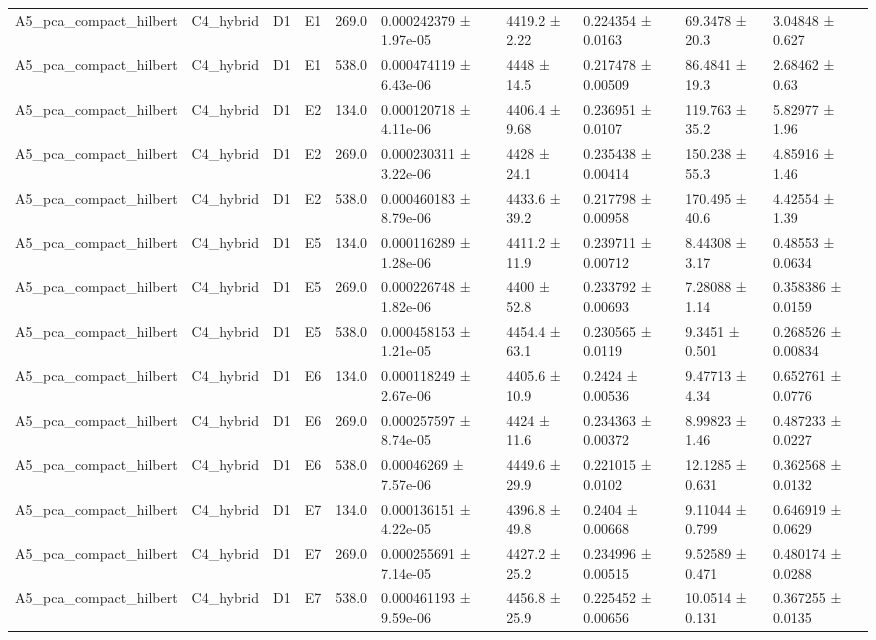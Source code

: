 \begin{table}
\begin{tabular}{llllllllll}
A5\_pca\_compact\_hilbert & C4\_hybrid & D1 & E1 & 269.0 & 0.000242379 ± 1.97e-05 & 4419.2 ± 2.22 & 0.224354 ± 0.0163 & 69.3478 ± 20.3 & 3.04848 ± 0.627 \\
A5\_pca\_compact\_hilbert & C4\_hybrid & D1 & E1 & 538.0 & 0.000474119 ± 6.43e-06 & 4448 ± 14.5 & 0.217478 ± 0.00509 & 86.4841 ± 19.3 & 2.68462 ± 0.63 \\
A5\_pca\_compact\_hilbert & C4\_hybrid & D1 & E2 & 134.0 & 0.000120718 ± 4.11e-06 & 4406.4 ± 9.68 & 0.236951 ± 0.0107 & 119.763 ± 35.2 & 5.82977 ± 1.96 \\
A5\_pca\_compact\_hilbert & C4\_hybrid & D1 & E2 & 269.0 & 0.000230311 ± 3.22e-06 & 4428 ± 24.1 & 0.235438 ± 0.00414 & 150.238 ± 55.3 & 4.85916 ± 1.46 \\
A5\_pca\_compact\_hilbert & C4\_hybrid & D1 & E2 & 538.0 & 0.000460183 ± 8.79e-06 & 4433.6 ± 39.2 & 0.217798 ± 0.00958 & 170.495 ± 40.6 & 4.42554 ± 1.39 \\
A5\_pca\_compact\_hilbert & C4\_hybrid & D1 & E5 & 134.0 & 0.000116289 ± 1.28e-06 & 4411.2 ± 11.9 & 0.239711 ± 0.00712 & 8.44308 ± 3.17 & 0.48553 ± 0.0634 \\
A5\_pca\_compact\_hilbert & C4\_hybrid & D1 & E5 & 269.0 & 0.000226748 ± 1.82e-06 & 4400 ± 52.8 & 0.233792 ± 0.00693 & 7.28088 ± 1.14 & 0.358386 ± 0.0159 \\
A5\_pca\_compact\_hilbert & C4\_hybrid & D1 & E5 & 538.0 & 0.000458153 ± 1.21e-05 & 4454.4 ± 63.1 & 0.230565 ± 0.0119 & 9.3451 ± 0.501 & 0.268526 ± 0.00834 \\
A5\_pca\_compact\_hilbert & C4\_hybrid & D1 & E6 & 134.0 & 0.000118249 ± 2.67e-06 & 4405.6 ± 10.9 & 0.2424 ± 0.00536 & 9.47713 ± 4.34 & 0.652761 ± 0.0776 \\
A5\_pca\_compact\_hilbert & C4\_hybrid & D1 & E6 & 269.0 & 0.000257597 ± 8.74e-05 & 4424 ± 11.6 & 0.234363 ± 0.00372 & 8.99823 ± 1.46 & 0.487233 ± 0.0227 \\
A5\_pca\_compact\_hilbert & C4\_hybrid & D1 & E6 & 538.0 & 0.00046269 ± 7.57e-06 & 4449.6 ± 29.9 & 0.221015 ± 0.0102 & 12.1285 ± 0.631 & 0.362568 ± 0.0132 \\
A5\_pca\_compact\_hilbert & C4\_hybrid & D1 & E7 & 134.0 & 0.000136151 ± 4.22e-05 & 4396.8 ± 49.8 & 0.2404 ± 0.00668 & 9.11044 ± 0.799 & 0.646919 ± 0.0629 \\
A5\_pca\_compact\_hilbert & C4\_hybrid & D1 & E7 & 269.0 & 0.000255691 ± 7.14e-05 & 4427.2 ± 25.2 & 0.234996 ± 0.00515 & 9.52589 ± 0.471 & 0.480174 ± 0.0288 \\
A5\_pca\_compact\_hilbert & C4\_hybrid & D1 & E7 & 538.0 & 0.000461193 ± 9.59e-06 & 4456.8 ± 25.9 & 0.225452 ± 0.00656 & 10.0514 ± 0.131 & 0.367255 ± 0.0135 \\

\end{tabular}
\end{table}
